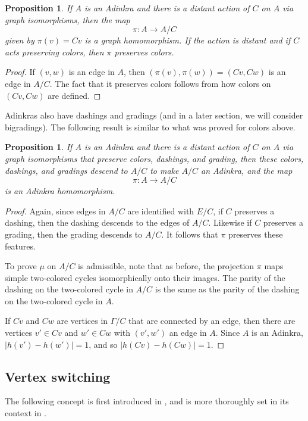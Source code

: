 \documentclass[12pt,twoside,singlespace]{article}
\numberwithin{equation}{section}
\newtheorem{prop}[equation]{Proposition}
\theoremstyle{definition}
\begin{document}
\begin{prop}
If $A$ is an Adinkra and there is a distant action of $C$ on $A$ via graph isomorphisms, then the map
\[\pi:A\to A/C\]
given by $\pi(v)=Cv$ is a graph homomorphism.  If the action is distant and if $C$ acts preserving colors, then $\pi$ preserves colors.
\end{prop}
\begin{proof}
If $(v,w)$ is an edge in $A$, then $(\pi(v),\pi(w))=(Cv,Cw)$ is an edge in $A/C$.  The fact that it preserves colors follows from how colors on $(Cv,Cw)$ are defined.
\end{proof}

Adinkras also have dashings and gradings (and in a later section, we will consider bigradings).  The following result is similar to what was proved for colors above.

\begin{prop}
\label{prop:quotient2}
If $A$ is an Adinkra and there is a distant action of $C$ on $A$ via graph isomorphisms that preserve colors, dashings, and grading, then these colors, dashings, and gradings descend to $A/C$ to make $A/C$ an Adinkra, and the map
\[\pi:A\to A/C\]
is an Adinkra homomorphism.
\end{prop}
\begin{proof}
Again, since edges in $A/C$ are identified with $E/C$, if $C$ preserves a dashing, then the dashing descends to the edges of $A/C$.  Likewise if $C$ preserves a grading, then the grading descends to $A/C$.  It follows that $\pi$ preserves these features.

To prove $\mu$ on $A/C$ is admissible, note that as before, the projection $\pi$ maps simple two-colored cycles isomorphically onto their images.  The parity of the dashing on the two-colored cycle in $A/C$ is the same as the parity of the dashing on the two-colored cycle in $A$.

If $Cv$ and $Cw$ are vertices in $\Gamma/C$ that are connected by an edge, then there are vertices $v'\in Cv$ and $w'\in Cw$ with $(v',w')$ an edge in $A$.  Since $A$ is an Adinkra, $|h(v')-h(w')|=1$, and so $|h(Cv)-h(Cw)|=1$.
\end{proof}


\subsection{Vertex switching}
The following concept is first introduced in \cite{d2l:first}, and is more thoroughly set in its context in \cite{dil:cohomology,zhang:adinkras}.
\end{document}

